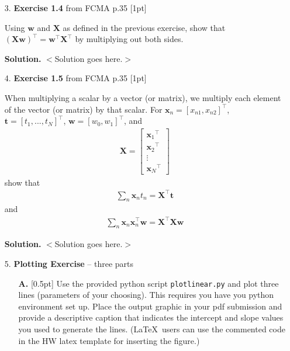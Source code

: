 \documentclass[10pt]{article}
\begin{document}
\begin{enumerate}
{\bf Solution.} $<$Solution goes here.$>$

\item[3.]
{\bf Exercise 1.4} from FCMA p.35  [1pt]

Using $\mathbf{w}$ and $\mathbf{X}$ as defined in the previous exercise, show that ${(\mathbf{X}\mathbf{w})}^\top = {\mathbf{w}}^\top{\mathbf{X}}^\top$ by multiplying out both sides.

{\bf Solution.} $<$Solution goes here.$>$

\item[4.]
{\bf Exercise 1.5} from FCMA p.35  [1pt]

When multiplying a scalar by a vector (or matrix), we multiply each element of the vector (or matrix) by that scalar.  For $\mathbf{x}_n = {[ x_{n1}, x_{n2} ]}^\top$, $\mathbf{t} = {[ t_1,...,t_N ]}^\top$, $\mathbf{w} = {[ w_0, w_1 ]}^\top$, and
\begin{eqnarray*}
\mathbf{X} = 
    \begin{bmatrix}
    {\mathbf{x}_{1}}^\top \\[0.3em]
    {\mathbf{x}_{2}}^\top \\[0.3em]
    \vdots \\[0.3em]
    {\mathbf{x}_{N}}^\top
    \end{bmatrix}
\end{eqnarray*}
show that
\begin{eqnarray*}
\sum_{n} \mathbf{x}_n t_n = \mathbf{X}^\top\mathbf{t}
\end{eqnarray*}
and
\begin{eqnarray*}
\sum_{n} \mathbf{x}_n \mathbf{x}_n ^\top \mathbf{w} = \mathbf{X}^\top\mathbf{X} \mathbf{w}
\end{eqnarray*}

{\bf Solution.} $<$Solution goes here.$>$

\newpage
\item[5.] 
{\bf Plotting Exercise} -- three parts

\begin{itemize}
\item[{\bf A.}] [0.5pt] Use the provided python script {\tt plotlinear.py} and plot three lines (parameters of your choosing).  This requires you have you python environment set up.  Place the output graphic in your pdf submission and provide a descriptive caption that indicates the intercept and slope values you used to generate the lines.  (\LaTeX~users can use the commented code in the HW latex template for inserting the figure.)


\end{itemize}
\end{enumerate}
\end{document}
